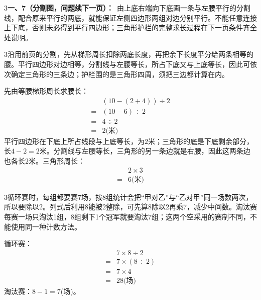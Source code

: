 \documentclass[multi=snippet,border={5bp 20bp 5bp 5bp}]{standalone}
\newenvironment{snippet}[3]{\begin{minipage}{#1bp}\color{answerred}\fontsize{#2}{#3}\selectfont\raggedright}{\end{minipage}}
\begin{document}
\begin{snippet}{505}{11.5}{14}\begin{multicols}{3}\raggedcolumns \textbf{一、7（分割图，问题续下一页）：}\ 由上底右端向下底画一条与左腰平行的分割线，配合原来平行的两底，就能保证左侧四边形两组对边分别平行。不能任意连接上下底，否则未必得到平行四边形；三角形护栏的完整求长过程在下一页条件齐全处说明。\end{multicols}\end{snippet}
\begin{snippet}{505}{11.5}{14}\begin{multicols}{3}\raggedcolumns 沿用前页的分割，先从梯形周长扣除两底长度，再把余下长度平分给两条相等的腰。平行四边形对边相等，分割线与左腰等长，所占下底又与上底等长，因此可依次确定三角形的三条边；护栏围的是三角形四周，须把三边都计算在内。\par 先由等腰梯形周长求腰长：\[\begin{aligned}&(10-(2+4))\div2\\={}&(10-6)\div2\\={}&4\div2\\={}&2\text{(米)}\end{aligned}\]平行四边形在下底上所占线段与上底等长，为\(2\)\allowbreak 米；三角形的底是下底剩余部分，长\(4-2=2\)\allowbreak 米。分割线与左腰等长，三角形的另一条边就是右腰，因此这两条边也各长\(2\)\allowbreak 米。三角形周长：\[\begin{aligned}&2\times3\\={}&6\text{(米)}\end{aligned}\]\end{multicols}\end{snippet}
\begin{snippet}{505}{11.5}{14}\begin{multicols}{3}\raggedcolumns 循环赛时，每组都要赛7场，按8组统计会把“甲对乙”与“乙对甲”同一场数两次，所以要除以2。列式后利用8能被2整除，可先算8除以2再乘7，减少中间数。淘汰赛每赛一场只淘汰1组，8组剩下1个冠军就要淘汰7组；这两个空采用的赛制不同，不能使用同一种计数方法。\par 循环赛：\[\begin{aligned}&7\times8\div2\\={}&7\times(8\div2)\\={}&7\times4\\={}&28\text{(场)}\end{aligned}\]淘汰赛：\(8-1=7\)\allowbreak (场)。\end{multicols}\end{snippet}
\end{document}
